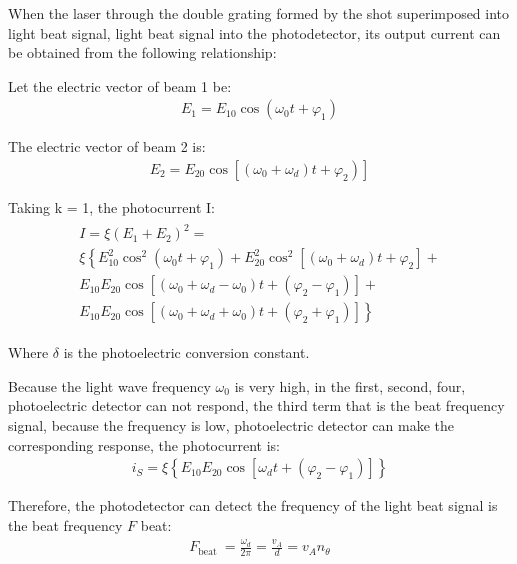 \documentclass[UTF8]{article}
\begin{document}
   When the laser through the double grating formed by the shot superimposed into light beat signal, light beat signal into the photodetector, its output current can be obtained from the following relationship:
   
   Let the electric vector of beam 1 be:
   \begin{eqnarray}
   E_{1}=E_{10} \cos \left(\omega_{0} t+\varphi_{1}\right)
   \end{eqnarray}
   
   The electric vector of beam 2 is:
   \begin{eqnarray}
   \left.E_{2}=E_{20} \cos \left[\left(\omega_{0}+\omega_{d}\right) t+\varphi_{2}\right)\right]
   \end{eqnarray}
   
   Taking k = 1, the photocurrent I:
   \begin{eqnarray}
   \begin{matrix}
   I=\xi\left(E_{1}+E_{2}\right)^{2} = \\
  \xi\left\{E_{10}^{2} \cos ^{2}\left(\omega_{0} t+\varphi_{1}\right)+E_{20}^{2} \cos ^{2}\left[\left(\omega_{0}+\omega_{d}\right) t+\varphi_{2}\right]+\right. \\
   E_{10} E_{20} \cos \left[\left(\omega_{0}+\omega_{d}-\omega_{0}\right) t+\left(\varphi_{2}-\varphi_{1}\right)\right]+ \\
   \left.E_{10} E_{20} \cos \left[\left(\omega_{0}+\omega_{d}+\omega_{0}\right) t+\left(\varphi_{2}+\varphi_{1}\right)\right]\right\}
   \end{matrix}
      \end{eqnarray}
      
   Where $\delta $ is the photoelectric conversion constant.
      
   Because the light wave frequency $\omega _0$ is very high, in the first, second, four, photoelectric detector can not respond, the third term that is the beat frequency signal, because the frequency is low, photoelectric detector can make the corresponding response, the photocurrent is:
   \begin{eqnarray}
   i_{S}=\xi\left\{E_{10} E_{20} \cos \left[\omega_{d} t+\left(\varphi_{2}-\varphi_{1}\right)\right]\right\}
   \end{eqnarray}   
   
   Therefore, the photodetector can detect the frequency of the light beat signal is the beat frequency $F$ beat:
   \begin{eqnarray}
   F_{\text {beat }}=\frac{\omega_{d}}{2 \pi}=\frac{v_{A}}{d}=v_{A} n_{\theta}
   \end{eqnarray}
   
\end{document}
